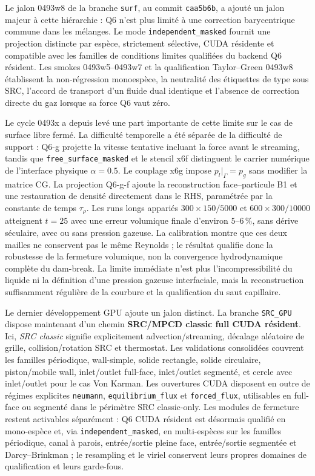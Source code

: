 \documentclass[11pt,a4paper]{article}
\begin{document}
Le jalon 0493w8 de la branche \texttt{surf}, au commit \texttt{caa5b6b}, a ajouté un jalon majeur à cette hiérarchie : Q6 n'est plus limité à une correction barycentrique commune dans les mélanges. Le mode \texttt{independent\_masked} fournit une projection distincte par espèce, strictement sélective, CUDA résidente et compatible avec les familles de conditions limites qualifiées du backend Q6 résident. Les smokes 0493w5--0493w7 et la qualification Taylor--Green 0493w8 établissent la non-régression monoespèce, la neutralité des étiquettes de type sous SRC, l'accord de transport d'un fluide dual identique et l'absence de correction directe du gaz lorsque sa force Q6 vaut zéro.

Le cycle 0493x a depuis levé une part importante de cette limite sur le cas de surface libre fermé. La difficulté temporelle a été séparée de la difficulté de support : Q6-g projette la vitesse tentative incluant la force avant le streaming, tandis que \texttt{free\_surface\_masked} et le stencil x6f distinguent le carrier numérique de l'interface physique $\alpha=0.5$. Le couplage x6g impose $p_l|_\Gamma=p_g$ sans modifier la matrice CG. La projection Q6-g-f ajoute la reconstruction face--particule B1 et une restauration de densité directement dans le RHS, paramétrée par la constante de temps $\tau_\rho$. Les runs longs appariés $300\times150/5000$ et $600\times300/10000$ atteignent $t=25$ avec une erreur volumique finale d'environ $5$--$6\,\%$, sans dérive séculaire, avec ou sans pression gazeuse. La calibration montre que ces deux mailles ne conservent pas le même Reynolds ; le résultat qualifie donc la robustesse de la fermeture volumique, non la convergence hydrodynamique complète du dam-break. La limite immédiate n'est plus l'incompressibilité du liquide ni la définition d'une pression gazeuse interfaciale, mais la reconstruction suffisamment régulière de la courbure et la qualification du saut capillaire.



Le dernier développement GPU ajoute un jalon distinct. La branche \texttt{SRC\_GPU} dispose maintenant d'un chemin \textbf{SRC/MPCD classic full CUDA résident}. Ici, \emph{SRC classic} signifie explicitement advection/streaming, décalage aléatoire de grille, collision/rotation SRC et thermostat. Les validations consolidées couvrent les familles périodique, wall-simple, solide rectangle, solide circulaire, piston/mobile wall, inlet/outlet full-face, inlet/outlet segmenté, et cercle avec inlet/outlet pour le cas Von Karman. Les ouvertures CUDA disposent en outre de régimes explicites \texttt{neumann}, \texttt{equilibrium\_flux} et \texttt{forced\_flux}, utilisables en full-face ou segmenté dans le périmètre SRC classic-only. Les modules de fermeture restent activables séparément : Q6 CUDA résident est désormais qualifié en mono-espèce et, via \texttt{independent\_masked}, en multi-espèces sur les familles périodique, canal à parois, entrée/sortie pleine face, entrée/sortie segmentée et Darcy--Brinkman ; le resampling et le viriel conservent leurs propres domaines de qualification et leurs garde-fous.
\end{document}

